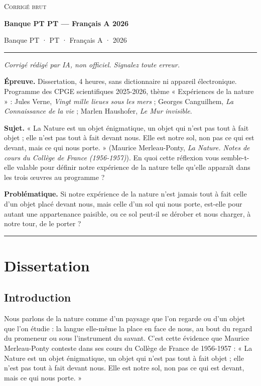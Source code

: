 \documentclass[11pt,a4paper]{article}
\begin{document}
\thispagestyle{plain}
\begin{center}
  {\small\scshape Corrigé brut}\par\smallskip
  {\LARGE\bfseries Banque PT PT — Français A 2026\par}\medskip
  {\large Banque PT · PT · Français A · 2026\par}
\end{center}
\vspace{2pt}\hrule\vspace{8pt}

\emph{Corrigé rédigé par IA, non officiel. Signalez toute erreur.}

\textbf{Épreuve.} Dissertation, 4 heures, sans dictionnaire ni appareil électronique. Programme des CPGE scientifiques 2025-2026, thème « Expériences de la nature » : Jules Verne, \emph{Vingt mille lieues sous les mers} ; Georges Canguilhem, \emph{La Connaissance de la vie} ; Marlen Haushofer, \emph{Le Mur invisible}.

\textbf{Sujet.} « La Nature est un objet énigmatique, un objet qui n'est pas tout à fait objet ; elle n'est pas tout à fait devant nous. Elle est notre sol, non pas ce qui est devant, mais ce qui nous porte. » (Maurice Merleau-Ponty, \emph{La Nature. Notes de cours du Collège de France (1956-1957)}). En quoi cette réflexion vous semble-t-elle valable pour définir notre expérience de la nature telle qu'elle apparaît dans les trois œuvres au programme ?

\textbf{Problématique.} Si notre expérience de la nature n'est jamais tout à fait celle d'un objet placé devant nous, mais celle d'un sol qui nous porte, est-elle pour autant une appartenance paisible, ou ce sol peut-il se dérober et nous charger, à notre tour, de le porter ?

\begin{center}\rule{0.5\linewidth}{0.5pt}\end{center}

\hypertarget{dissertation}{%
\section{Dissertation}\label{dissertation}}

\hypertarget{introduction}{%
\subsection{Introduction}\label{introduction}}

Nous parlons de la nature comme d'un paysage que l'on regarde ou d'un objet que l'on étudie : la langue elle-même la place en face de nous, au bout du regard du promeneur ou sous l'instrument du savant. C'est cette évidence que Maurice Merleau-Ponty conteste dans ses cours du Collège de France de 1956-1957 : « La Nature est un objet énigmatique, un objet qui n'est pas tout à fait objet ; elle n'est pas tout à fait devant nous. Elle est notre sol, non pas ce qui est devant, mais ce qui nous porte. »
\end{document}
